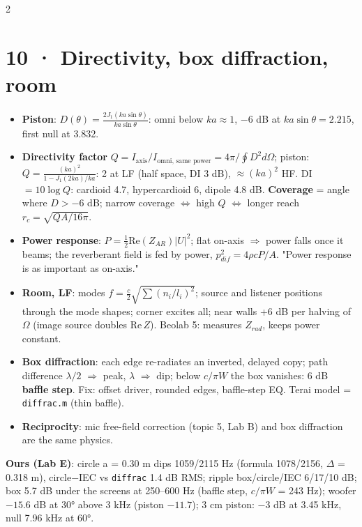 \documentclass[8pt]{extarticle}
\begin{document}
\begin{multicols}{2}
\section{10 · Directivity, box diffraction, room}
\begin{itemize}
\item \textbf{Piston}: $D(\theta)=\frac{2J_1(ka\sin\theta)}{ka\sin\theta}$: omni below $ka\approx1$, $-6$ dB at $ka\sin\theta=2.215$, first null at 3.832.
\item \textbf{Directivity factor} $Q=I_{\text{axis}}/I_{\text{omni, same power}}=4\pi/\oint D^2d\Omega$; piston: $Q=\frac{(ka)^2}{1-J_1(2ka)/ka}$: 2 at LF (half space, DI 3 dB), $\approx(ka)^2$ HF. DI $=10\log Q$: cardioid 4.7, hypercardioid 6, dipole 4.8 dB. \textbf{Coverage} = angle where $D>-6$ dB; narrow coverage $\Leftrightarrow$ high $Q$ $\Leftrightarrow$ longer reach $r_c=\sqrt{QA/16\pi}$.
\item \textbf{Power response}: $P=\tfrac12\mathrm{Re}(Z_{AR})|U|^2$; flat on-axis $\Rightarrow$ power falls once it beams; the reverberant field is fed by power, $p^2_{dif}=4\rho cP/A$. "Power response is as important as on-axis."
\item \textbf{Room, LF}: modes $f=\frac c2\sqrt{\sum(n_i/l_i)^2}$; source and listener positions through the mode shapes; corner excites all; near walls +6 dB per halving of $\Omega$ (image source doubles $\mathrm{Re}\,Z$). Beolab 5: measures $Z_{rad}$, keeps power constant.
\item \textbf{Box diffraction}: each edge re-radiates an inverted, delayed copy; path difference $\lambda/2$ $\Rightarrow$ peak, $\lambda$ $\Rightarrow$ dip; below $c/\pi W$ the box vanishes: 6 dB \textbf{baffle step}. Fix: offset driver, rounded edges, baffle-step EQ. Terai model = \texttt{diffrac.m} (thin baffle).
\item \textbf{Reciprocity}: mic free-field correction (topic 5, Lab B) and box diffraction are the same physics.
\end{itemize}
\textbf{Ours (Lab E)}: circle a = 0.30 m dips 1059/2115 Hz (formula 1078/2156, $\Delta$ = 0.318 m), circle$-$IEC vs \texttt{diffrac} 1.4 dB RMS; ripple box/circle/IEC 6/17/10 dB; box 5.7 dB under the screens at 250–600 Hz (baffle step, $c/\pi W$ = 243 Hz); woofer $-15.6$ dB at 30° above 3 kHz (piston $-11.7$); 3 cm piston: $-3$ dB at 3.45 kHz, null 7.96 kHz at 60°.


\end{multicols}
\end{document}
